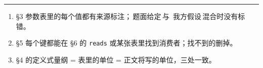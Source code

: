 \documentclass[a4paper,11pt]{ctexart}
\newcommand{\src}[1]{{\footnotesize\colorbox{black!8}{\,#1\,}}}
\newcommand{\given}{\src{题面给定}}
\newcommand{\assumed}{\src{我方假设}}
\begin{document}
\vspace{1em}
\noindent\rule{\textwidth}{0.6pt}
\vspace{0.4em}

\par
\begin{enumerate}[label=(\arabic*)]
  \item §3 参数表里的每个值都有来源标注；\given 与 \assumed 混合时没有标错。
  \item §5 每个键都能在 §6 的 \texttt{reads} 或某张表里找到消费者；找不到的删掉。
  \item §4 的定义式量纲 = 表里的单位 = 正文将写的单位，三处一致。
\end{enumerate}
\end{document}
